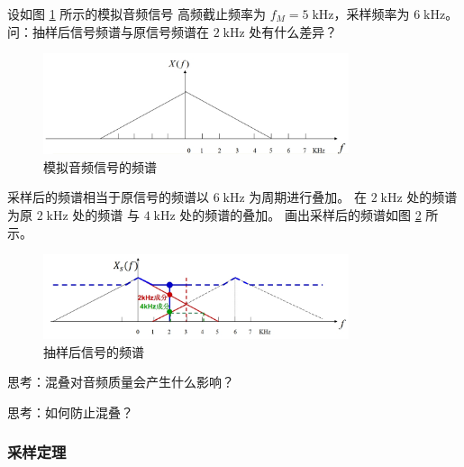 \begin{example}
    设如图 \ref{fig:aliasing-example-3} 所示的模拟音频信号
    高频截止频率为 $f_M = 5\;\mathrm{kHz}$，采样频率为 $6\;\mathrm{kHz}$。
    问：抽样后信号频谱与原信号频谱在 $2\;\mathrm{kHz}$ 处有什么差异？
    \begin{figure}[H]
        \centering
        \includegraphics[width=0.8\textwidth]{chap2/img/aliasing-example-3.png}
        \caption{模拟音频信号的频谱}
        \label{fig:aliasing-example-3}
    \end{figure}
\end{example}

\begin{solution}
    采样后的频谱相当于原信号的频谱以 $6\;\mathrm{kHz}$ 为周期进行叠加。
    在 $2\;\mathrm{kHz}$ 处的频谱为原 $2\;\mathrm{kHz}$ 处的频谱
    与 $4\;\mathrm{kHz}$ 处的频谱的叠加。
    画出采样后的频谱如图 \ref{fig:aliasing-example-4} 所示。
    \begin{figure}[H]
        \centering
        \includegraphics[width=0.8\textwidth]{chap2/img/aliasing-example-4.png}
        \caption{抽样后信号的频谱}
        \label{fig:aliasing-example-4}
    \end{figure}
\end{solution}

\begin{remark}
    思考：混叠对音频质量会产生什么影响？
\end{remark}

\begin{remark}
    思考：如何防止混叠？
\end{remark}

\subsubsection{采样定理}

